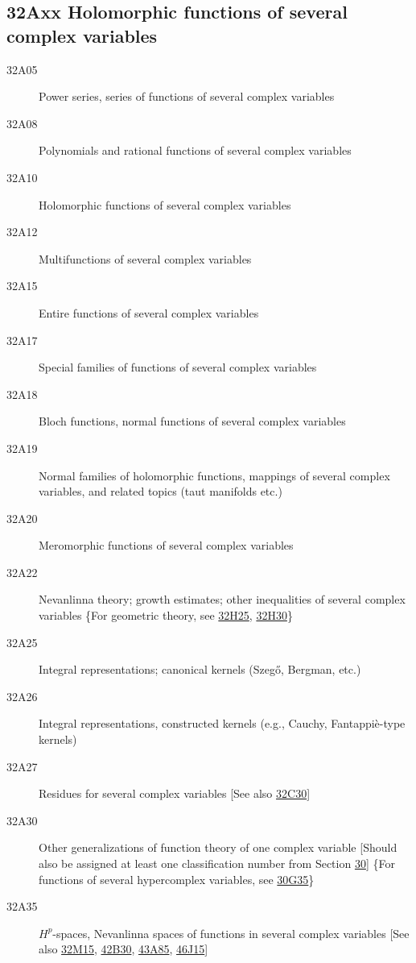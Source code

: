 \subsection*{32Axx  Holomorphic functions of several complex variables }\label{32Axx}
\begin{description}  
\item [32A05]\label{32A05} Power series, series of functions of several complex variables
\item [32A08]\label{32A08} Polynomials and rational functions of several complex variables
\item [32A10]\label{32A10} Holomorphic functions of several complex variables
\item [32A12]\label{32A12} Multifunctions of several complex variables
\item [32A15]\label{32A15} Entire functions of several complex variables
\item [32A17]\label{32A17} Special families of functions of several complex variables
\item [32A18]\label{32A18} Bloch functions, normal functions of several complex variables
\item [32A19]\label{32A19} Normal families of holomorphic functions, mappings of several complex variables, and related topics (taut manifolds etc.)
\item [32A20]\label{32A20} Meromorphic functions of several complex variables
\item [32A22]\label{32A22} Nevanlinna theory; growth estimates; other inequalities of several complex variables \{For geometric theory, see \hyperref[32H25]{32H25}, \hyperref[32H30]{32H30}\}
\item [32A25]\label{32A25} Integral representations; canonical kernels (Szeg\H{o}, Bergman, etc.) 
\item [32A26]\label{32A26} Integral representations, constructed kernels (e.g., Cauchy, Fantappi\`{e}-type kernels)
\item [32A27]\label{32A27} Residues for several complex variables [See also \hyperref[32C30]{32C30}]
\item [32A30]\label{32A30} Other generalizations of function theory of one complex variable [Should also be assigned at least one classification number from Section \hyperref[30-XX]{30}] \{For functions of several hypercomplex variables, see \hyperref[30G35]{30G35}\}
\item [32A35]\label{32A35} $H^p$-spaces, Nevanlinna spaces of functions in several complex variables [See also \hyperref[32M15]{32M15}, \hyperref[42B30]{42B30}, \hyperref[43A85]{43A85}, \hyperref[46J15]{46J15}]

\end{description}
